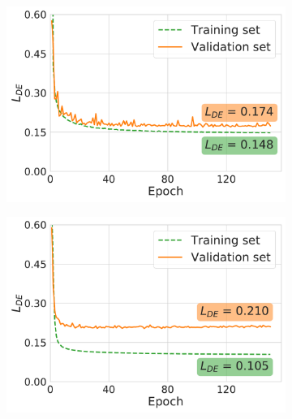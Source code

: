 \begin{figure}
    
    \vspace{1em}

    \begin{subfigure}[b]{0.49\linewidth}
        \centering
        \includegraphics[width=\linewidth]{figures/de_5j0n.pdf}
        \caption{}
    \end{subfigure}
    \begin{subfigure}[b]{0.49\linewidth}
        \centering
        \includegraphics[width=\linewidth]{figures/de_5a1a.pdf}
        \caption{}
    \end{subfigure}
    \\ \vspace{1em}
    \begin{subfigure}[b]{0.49\linewidth}
        \centering

\end{subfigure}
\end{figure}
